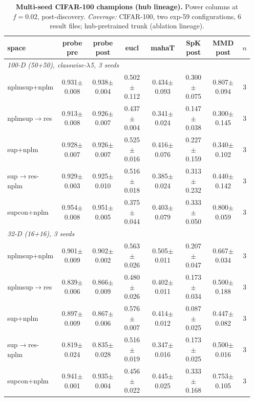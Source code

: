 \begin{landscape}
\begin{table}[p]
\centering
\footnotesize
\setlength{\tabcolsep}{3pt}
\begin{tabular}{lccccccc}
\toprule
space & probe pre & probe post & eucl & mahaT & SpK post & MMD post & $n$ \\
\midrule
\multicolumn{8}{l}{\emph{100-D (50+50), classwise-$\lambda$5, 3 seeds}} \\
\quad nplmsup+nplm & 0.931$\pm$0.008 & 0.938$\pm$0.004 & 0.502$\pm$0.112 & 0.434$\pm$0.093 & 0.300$\pm$0.075 & 0.807$\pm$0.094 & 3 \\
\quad nplmsup$\to$res & 0.913$\pm$0.008 & 0.926$\pm$0.007 & 0.437$\pm$0.004 & 0.341$\pm$0.024 & 0.147$\pm$0.038 & 0.300$\pm$0.145 & 3 \\
\quad sup+nplm & 0.928$\pm$0.007 & 0.926$\pm$0.007 & 0.525$\pm$0.016 & 0.416$\pm$0.076 & 0.227$\pm$0.159 & 0.340$\pm$0.102 & 3 \\
\quad sup$\to$res-nplm & 0.929$\pm$0.003 & 0.925$\pm$0.010 & 0.516$\pm$0.018 & 0.385$\pm$0.024 & 0.313$\pm$0.232 & 0.440$\pm$0.142 & 3 \\
\quad supcon+nplm & 0.954$\pm$0.008 & 0.951$\pm$0.005 & 0.375$\pm$0.044 & 0.403$\pm$0.079 & 0.333$\pm$0.050 & 0.800$\pm$0.059 & 3 \\
\multicolumn{8}{l}{\emph{32-D (16+16), 3 seeds}} \\
\quad nplmsup+nplm & 0.901$\pm$0.009 & 0.902$\pm$0.002 & 0.563$\pm$0.026 & 0.505$\pm$0.011 & 0.207$\pm$0.047 & 0.667$\pm$0.034 & 3 \\
\quad nplmsup$\to$res & 0.839$\pm$0.006 & 0.866$\pm$0.009 & 0.480$\pm$0.026 & 0.402$\pm$0.011 & 0.173$\pm$0.034 & 0.500$\pm$0.188 & 3 \\
\quad sup+nplm & 0.897$\pm$0.009 & 0.867$\pm$0.006 & 0.576$\pm$0.007 & 0.414$\pm$0.012 & 0.087$\pm$0.025 & 0.447$\pm$0.082 & 3 \\
\quad sup$\to$res-nplm & 0.819$\pm$0.024 & 0.835$\pm$0.028 & 0.516$\pm$0.019 & 0.347$\pm$0.016 & 0.173$\pm$0.025 & 0.500$\pm$0.016 & 3 \\
\quad supcon+nplm & 0.941$\pm$0.001 & 0.935$\pm$0.004 & 0.456$\pm$0.022 & 0.445$\pm$0.025 & 0.333$\pm$0.168 & 0.753$\pm$0.105 & 3 \\
\bottomrule
\end{tabular}
\caption{\textbf{Multi-seed CIFAR-100 champions (hub lineage).} Power columns at $f{=}0.02$, post-discovery. \emph{Coverage:} CIFAR-100, two exp-59 configurations, 6 result files; hub-pretrained trunk (ablation lineage).}
\label{tab:app_seeds_c100}
\end{table}
\end{landscape}
